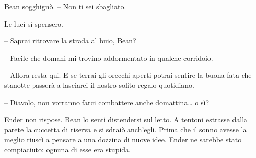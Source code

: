 {Bean sogghignò. -- Non ti sei sbagliato.}

{Le luci si spensero.}

{-- Saprai ritrovare la strada al buio, Bean?}

{-- Facile che domani mi trovino addormentato in qualche corridoio.}

{-- Allora resta qui. E se terrai gli orecchi aperti potrai sentire la
	buona fata che stanotte passerà a lasciarci il nostro solito regalo
	quotidiano.}

{-- Diavolo, non vorranno farci combattere anche domattina\ldots{} o
	sì?}

{Ender non rispose. Bean lo sentì distendersi sul letto. A tentoni
	estrasse dalla parete la cuccetta di riserva e si sdraiò anch'egli.
	Prima che il sonno avesse la meglio riuscì a pensare a una dozzina di
	nuove idee. Ender ne sarebbe stato compiaciuto: ognuna di esse era
	stupida.}

\label{Orsonux20Scottux20Cardux20-ux20Ilux20Giocoux20Diux20Enderux20-ux20BY_SLY70A1_split_014.htm}{}
